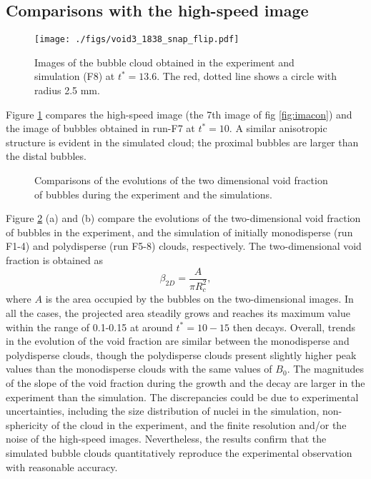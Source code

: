 \documentclass{jfm}
\begin{document}
\subsection{Comparisons with the high-speed image}
\begin{figure}
  \center
  \texttt{[image: ./figs/void3\_1838\_snap\_flip.pdf]}
  \caption{Images of the bubble cloud obtained in the experiment and simulation (F8) at $t^*=13.6$. The red, dotted line shows a circle with radius 2.5 mm. }
   \label{fig:cloud_comp} 
\end{figure}
Figure \ref{fig:cloud_comp} compares the high-speed image (the 7th image of fig \ref{fig:imacon}) and the image of bubbles obtained in run-F7 at $t^*=10$.
A similar anisotropic structure is evident in the simulated cloud; the proximal bubbles are larger than the distal bubbles.

\begin{figure}
  \center
  \caption{Comparisons of the evolutions of the two dimensional void fraction of bubbles during the experiment and the simulations.}
   \label{fig:2Devol} 
\end{figure}
Figure \ref{fig:2Devol} (a) and (b) compare the evolutions of the two-dimensional void fraction of bubbles in the experiment, and the simulation of initially monodisperse (run F1-4) and polydisperse (run F5-8) clouds, respectively.
The two-dimensional void fraction is obtained as
\begin{equation}
\beta_{2D}=\frac{A}{\pi R_c^2},
\end{equation}
where $A$ is the area occupied by the bubbles on the two-dimensional images.
In all the cases, the projected area steadily grows and reaches its maximum value within the range of 0.1-0.15 at around $t^*=10-15$ then decays.
Overall, trends in the evolution of the void fraction are similar between the monodisperse and polydisperse clouds, though the polydisperse clouds present slightly higher peak values than the monodisperse clouds with the same values of $B_0$.
The magnitudes of the slope of the void fraction during the growth and the decay are larger in the experiment than the simulation.
The discrepancies could be due to experimental uncertainties, including the size distribution of nuclei in the simulation, non-sphericity of the cloud in the experiment, and the finite resolution and/or the noise of the high-speed images.
Nevertheless, the results confirm that the simulated bubble clouds quantitatively reproduce the experimental observation with reasonable accuracy.
\end{document}
